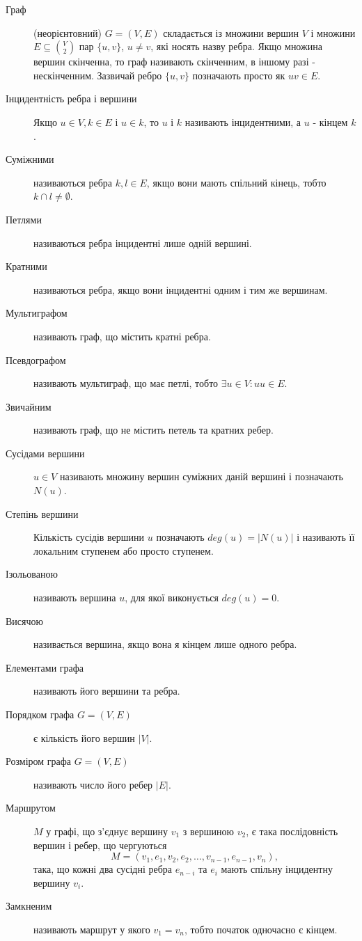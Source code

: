 \begin{description}
\item[Граф] (неорієнтовний) $G = (V,E)$ складається із множини вершин $V$ і множини $E \subseteq {V \choose 2}$ пар $\{u,v\}$, $u \neq v$, які носять назву ребра. Якщо множина вершин скінченна, то граф називають скінченним, в іншому разі - нескінченним.
  Зазвичай ребро $\lbrace u,v \rbrace$ позначають просто як $uv \in E$.
\item[Інцидентність ребра і вершини] Якщо $u \in V, k \in E$ і $u \in k$, то $u$ і $k$ називають інцидентними, а $u$ - кінцем $k$.
\item[Суміжними] називаються ребра $k,l \in E$, якщо вони мають спільний кінець, тобто $k \cap l \ne \emptyset$.
\item[Петлями] називаються ребра інцидентні лише одній вершині.
\item[Кратними] називаються ребра, якщо вони інцидентні одним і тим же вершинам.
\item[Мультиграфом] називають граф, що містить кратні ребра.
\item[Псевдографом] називають мультиграф, що має петлі, тобто $\exists u \in V : uu \in E$.
\item[Звичайним] називають граф, що не містить петель та кратних ребер.
\item[Сусідами вершини] $u \in V$ називають множину вершин суміжних даній вершині і позначають $N(u)$.
\item[Степінь вершини] Кількість сусідів вершини $u$ позначають $deg(u) = \vert N(u) \vert$ і називають її локальним ступенем або просто ступенем.
\item[Ізольованою] називають вершина $u$, для якої виконується $deg(u) = 0$.
\item[Висячою] називається вершина, якщо вона я кінцем лише одного ребра.
\item[Елементами графа] називають його вершини та ребра.
\item[Порядком графа $G=(V,E)$] є кількість його вершин $\vert V \vert$.
\item[Розміром графа $G=(V,E)$] називають число його ребер $\vert E \vert$.
\item[Маршрутом] $M$ у графі, що з'єднує вершину $v_1$ з вершиною $v_2$, є така послідовність вершин і ребер, що чергуються $$M=(v_1,e_1,v_2,e_2,\dots,v_{n-1},e_{n-1},v_n),$$ така, що кожні два сусідні ребра $e_{n-i}$ та $e_i$ мають спільну інцидентну вершину $v_i$.
\item[Замкненим] називають маршрут у якого $v_1=v_n$, тобто початок одночасно є кінцем.

\end{description}

